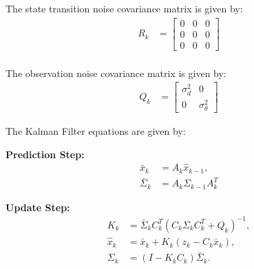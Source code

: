 \documentclass[answers]{exam}
\begin{document}
\begin{questions}
\begin{parts}
\begin{solution}
            The state transition noise covariance matrix is given by:
            \begin{align*}
                R_k & = \begin{bmatrix}
                            0 & 0 & 0 \\
                            0 & 0 & 0 \\
                            0 & 0 & 0
                        \end{bmatrix} \\
            \end{align*}

            The observation noise covariance matrix is given by:
            \begin{align*}
                Q_k & = \begin{bmatrix}
                            \sigma^2_{d} & 0                 \\
                            0            & \sigma^2_{\theta}
                        \end{bmatrix}
            \end{align*}

            The Kalman Filter equations are given by:

            \textbf{Prediction Step:}
            \begin{align*}
                \bar{x}_{k}      & = A_{k} \hat{x}_{k-1},       \\
                \bar{\Sigma}_{k} & = A_{k} \Sigma_{k-1} A_{k}^T
            \end{align*}

            \textbf{Update Step:}
            \begin{align*}
                K_{k}       & = \bar{\Sigma}_{k} C_{k}^T \left(C_{k} \Sigma_{k} C_{k}^T + Q_{k}\right)^{-1}, \\
                \hat{x}_{k} & = \bar{x}_{k} + K_{k} \left(z_{k} - C_{k} \bar{x}_{k}\right),                  \\
                \Sigma_{k}  & = \left(I - K_{k} C_{k}\right) \bar{\Sigma}_{k}.
            \end{align*}
        \end{solution}


\end{parts}
\end{questions}
\end{document}
